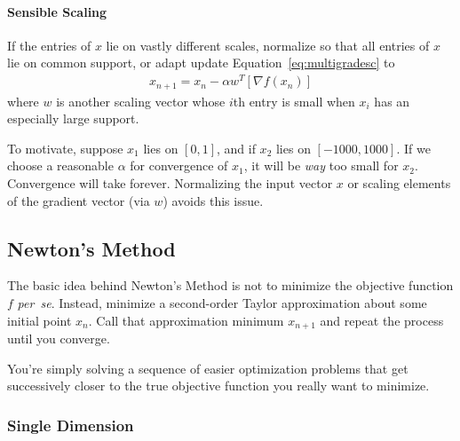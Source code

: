 \documentclass[a4paper,12pt]{scrartcl}
\theoremstyle{definition}
\theoremstyle{remark}
\begin{document}
\paragraph{Sensible Scaling}
If the entries of $x$ lie on vastly different scales, normalize so that
all entries of $x$ lie on common support, or adapt update
Equation~\ref{eq:multigradesc} to
\begin{align}
  x_{n+1} = x_n - \alpha w^T [\nabla f(x_n)]
\end{align}
where $w$ is another scaling vector whose $i$th entry is small when
$x_i$ has an especially large support.

To motivate, suppose $x_1$ lies on $[0,1]$, and if $x_2$ lies on
$[-1000, 1000]$. If we choose a reasonable $\alpha$ for convergence of
$x_1$, it will be \emph{way} too small for $x_2$. Convergence will take
forever. Normalizing the input vector $x$ or scaling elements of the
gradient vector (via $w$) avoids this issue.


\subsection{Newton's Method}

The basic idea behind Newton's Method is not to minimize the objective
function $f$ \emph{per~se}. Instead, minimize a second-order Taylor
approximation about some initial point $x_n$. Call that approximation
minimum $x_{n+1}$ and repeat the process until you converge.

You're simply solving a  sequence of easier optimization problems that
get successively closer to the true objective function you really want
to minimize.


\subsubsection{Single Dimension}
\end{document}
